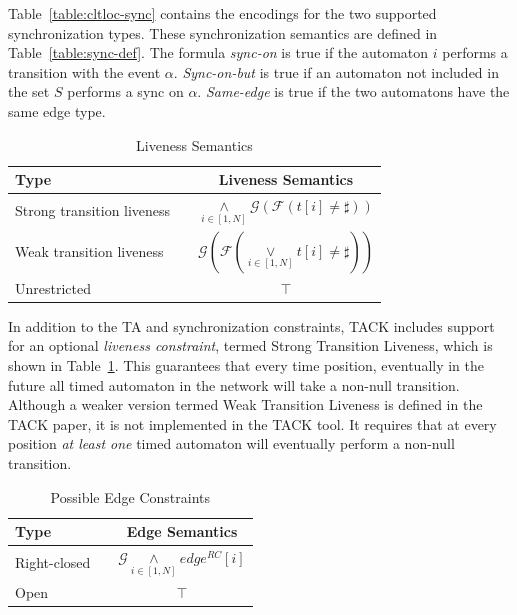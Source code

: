 \documentclass[a4paper,11pt]{report}
\theoremstyle{definition}
\begin{document}
Table~\ref{table:cltloc-sync} contains the encodings for the two supported
synchronization types. These synchronization semantics are defined in
Table~\ref{table:sync-def}. The formula \emph{sync-on} is true if the automaton
$i$ performs a transition with the event $\alpha$. \emph{Sync-on-but} is true if
an automaton not included in the set $S$ performs a sync on $\alpha$.
\emph{Same-edge} is true if the two automatons have the same edge type.



\begin{table}[h]
  \centering
  \begin{tabular}{p{} p{} c}
    \toprule
    \textbf{Type} && \textbf{Liveness Semantics} \\
    \midrule
    Strong transition liveness &&
                                 $\underset{i \in [1,N]}{\land} \mathcal{G}(\mathcal{F}(t[i] \neq \sharp))$
    \\
    \midrule
    Weak transition liveness && $\mathcal{G}(\mathcal{F}(\underset{i \in [1,N]}{\lor} t[i] \neq \sharp))$ \\
    \midrule
    Unrestricted && $\top$ \\
    \bottomrule
  \end{tabular}
  \caption{Liveness Semantics}
  \label{table:liveness-def}
\end{table}

In addition to the TA and synchronization constraints, TACK includes support for
an optional \emph{liveness constraint}, termed Strong Transition Liveness, which
is shown in Table~\ref{table:liveness-def}. This
guarantees that every time position, eventually in the future all timed
automaton in the network will take a non-null transition. Although a weaker
version termed Weak Transition Liveness is defined in the TACK paper, it is not
implemented in the TACK tool. It requires that at every position \emph{at least
  one} timed automaton will eventually perform a non-null transition.

\begin{table}[h]
  \centering
  \begin{tabular}{l c c}
    \toprule
    \textbf{Type} &\quad\quad\quad\quad & \textbf{Edge Semantics} \\
    \midrule
    Right-closed & & $\mathcal{G} \underset{i \in [1,N]}{\land} edge^{RC}[i]$ \\
    \midrule
    Open & & $\top$ \\
    \bottomrule
  \end{tabular}
  \caption{Possible Edge Constraints}
  \label{table:edge-def}
\end{table}
\end{document}
